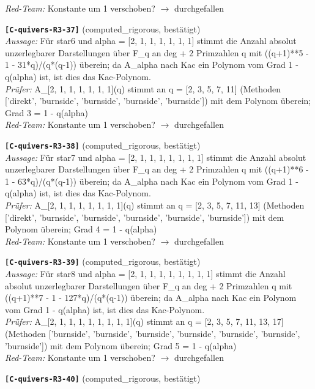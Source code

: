 \documentclass[11pt]{article}
\theoremstyle{definition}\newtheorem{definition}[theorem]{Definition}\newtheorem{remark}[theorem]{Remark}\newtheorem{observation}[theorem]{Numerical observation}
\begin{document}
\textit{Red-Team:} Konstante um 1 verschoben? $\to$ durchgefallen\par\medskip
\noindent\textbf{\texttt{[C-quivers-R3-37]}} (computed\_rigorous, bestätigt)\\
\textit{Aussage:} Für star6 und alpha = [2, 1, 1, 1, 1, 1, 1] stimmt die Anzahl absolut unzerlegbarer Darstellungen über F\_q an deg + 2 Primzahlen q mit ((q+1)**5 - 1 - 31*q)/(q*(q-1)) überein; da A\_alpha nach Kac ein Polynom vom Grad 1 - q(alpha) ist, ist dies das Kac-Polynom.\\
\textit{Prüfer:} A\_[2, 1, 1, 1, 1, 1, 1](q) stimmt an q = [2, 3, 5, 7, 11] (Methoden ['direkt', 'burnside', 'burnside', 'burnside', 'burnside']) mit dem Polynom überein; Grad 3 = 1 - q(alpha)\\
\textit{Red-Team:} Konstante um 1 verschoben? $\to$ durchgefallen\par\medskip
\noindent\textbf{\texttt{[C-quivers-R3-38]}} (computed\_rigorous, bestätigt)\\
\textit{Aussage:} Für star7 und alpha = [2, 1, 1, 1, 1, 1, 1, 1] stimmt die Anzahl absolut unzerlegbarer Darstellungen über F\_q an deg + 2 Primzahlen q mit ((q+1)**6 - 1 - 63*q)/(q*(q-1)) überein; da A\_alpha nach Kac ein Polynom vom Grad 1 - q(alpha) ist, ist dies das Kac-Polynom.\\
\textit{Prüfer:} A\_[2, 1, 1, 1, 1, 1, 1, 1](q) stimmt an q = [2, 3, 5, 7, 11, 13] (Methoden ['direkt', 'burnside', 'burnside', 'burnside', 'burnside', 'burnside']) mit dem Polynom überein; Grad 4 = 1 - q(alpha)\\
\textit{Red-Team:} Konstante um 1 verschoben? $\to$ durchgefallen\par\medskip
\noindent\textbf{\texttt{[C-quivers-R3-39]}} (computed\_rigorous, bestätigt)\\
\textit{Aussage:} Für star8 und alpha = [2, 1, 1, 1, 1, 1, 1, 1, 1] stimmt die Anzahl absolut unzerlegbarer Darstellungen über F\_q an deg + 2 Primzahlen q mit ((q+1)**7 - 1 - 127*q)/(q*(q-1)) überein; da A\_alpha nach Kac ein Polynom vom Grad 1 - q(alpha) ist, ist dies das Kac-Polynom.\\
\textit{Prüfer:} A\_[2, 1, 1, 1, 1, 1, 1, 1, 1](q) stimmt an q = [2, 3, 5, 7, 11, 13, 17] (Methoden ['burnside', 'burnside', 'burnside', 'burnside', 'burnside', 'burnside', 'burnside']) mit dem Polynom überein; Grad 5 = 1 - q(alpha)\\
\textit{Red-Team:} Konstante um 1 verschoben? $\to$ durchgefallen\par\medskip
\noindent\textbf{\texttt{[C-quivers-R3-40]}} (computed\_rigorous, bestätigt)\\
\end{document}
